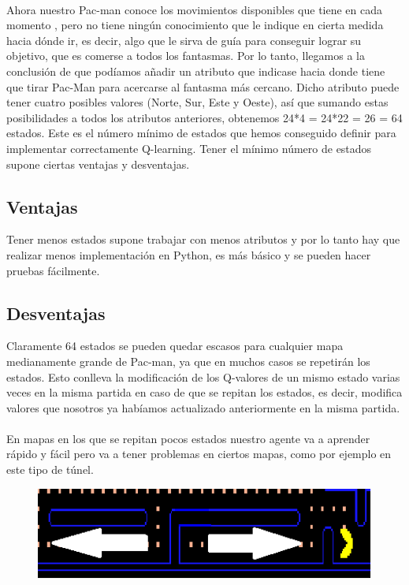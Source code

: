 \documentclass[11pt,a4paper]{article}
\begin{document}
\paragraph{}
Ahora nuestro Pac-man conoce los movimientos disponibles que tiene en cada momento , pero no tiene ningún conocimiento que le indique en cierta medida hacia dónde ir, es decir, algo que le sirva de guía para conseguir lograr su objetivo, que es comerse a todos los fantasmas. Por lo tanto, llegamos a la conclusión de que podíamos añadir un atributo que indicase hacia donde tiene que tirar Pac-Man para acercarse al fantasma más cercano. 
Dicho atributo puede tener cuatro posibles valores (Norte, Sur, Este y Oeste), así que sumando estas posibilidades a todos los atributos anteriores, obtenemos 24*4 = 24*22 = 26 = 64 estados.
Este es el número mínimo de estados que hemos conseguido definir para implementar correctamente Q-learning. Tener el mínimo número de estados supone ciertas ventajas y desventajas.

\subsection{Ventajas}

Tener menos estados supone trabajar con menos atributos y por lo tanto hay que realizar menos implementación en Python, es más básico y se pueden hacer pruebas fácilmente.

\subsection{Desventajas}

Claramente 64 estados se pueden quedar escasos para cualquier mapa medianamente grande de Pac-man, ya que en muchos casos se repetirán los estados. Esto conlleva la modificación de los Q-valores de un mismo estado varias veces en la misma partida en caso de que se repitan los estados, es decir, modifica valores que nosotros ya habíamos actualizado anteriormente en la misma partida.

\paragraph{}
En mapas en los que se repitan pocos estados nuestro agente va a aprender rápido y fácil pero va a tener problemas en ciertos mapas, como por ejemplo en este tipo de túnel. 

\begin{figure}[H]
\centering
\includegraphics[scale=1]{images/estado.png}
\end{figure}
\end{document}
